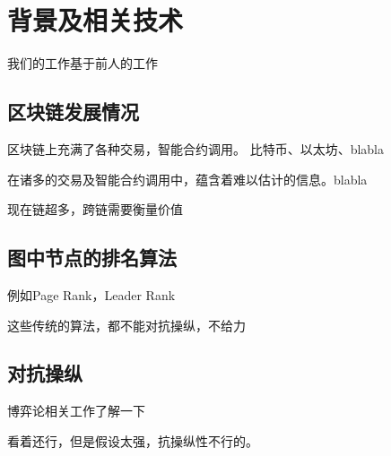 \section{背景及相关技术}
我们的工作基于前人的工作

\subsection{区块链发展情况}
区块链上充满了各种交易，智能合约调用。 比特币、以太坊、blabla

在诸多的交易及智能合约调用中，蕴含着难以估计的信息。blabla

现在链超多，跨链需要衡量价值


\subsection{图中节点的排名算法}
例如Page Rank，Leader Rank

这些传统的算法，都不能对抗操纵，不给力

\subsection{对抗操纵}
博弈论相关工作了解一下

看着还行，但是假设太强，抗操纵性不行的。
